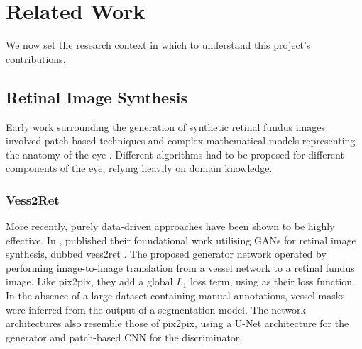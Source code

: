 \chapter{Related Work} \label{cha:relatedwork}

We now set the research context in which to understand this project's contributions.

\section{Retinal Image Synthesis} \label{sec:retinalimagesynthesis}


Early work surrounding the generation of synthetic retinal fundus images involved patch-based techniques and complex mathematical models representing the anatomy of the eye \cite{BONALDI201654, N20103:2014}.
Different algorithms had to be proposed for different components of the eye, relying heavily on domain knowledge.

\subsection{Vess2Ret}

More recently, purely data-driven approaches have been shown to be highly effective.
In \citeyear{Costa2017}, \citeauthor{Costa2017} published their foundational work utilising GANs for retinal image synthesis, dubbed vess2ret \cite{Costa2017}.
The proposed generator network operated by performing image-to-image translation from a vessel network to a retinal fundus image.
Like pix2pix, they add a global $L_1$ loss term, using  as their loss function.
In the absence of a large dataset containing manual annotations, vessel masks were inferred from the output of a segmentation model.
The network architectures also resemble those of pix2pix, using a U-Net architecture for the generator and patch-based CNN for the discriminator.

